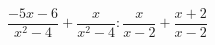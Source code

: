 \begin{ex}[type=simplify_calculate]
	\begin{condition}
		\(\dfrac{-5x-6}{x^2-4}+\dfrac{x}{x^2-4}:\dfrac{x}{x-2}+\dfrac{x+2}{x-2}\)
	\end{condition}
\end{ex}